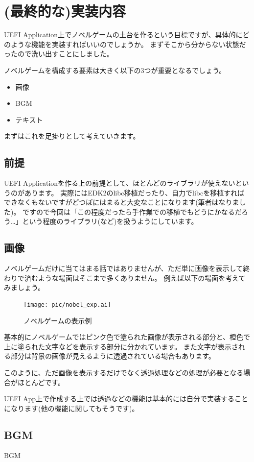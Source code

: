 \documentclass[10pt, b5paper, openany]{ltjsbook}
\begin{document}
\chapter{(最終的な)実装内容}
UEFI Application上でノベルゲームの土台を作るという目標ですが、具体的にどのような機能を実装すればいいのでしょうか。
まずそこから分からない状態だったので洗い出すことにしました。

ノベルゲームを構成する要素は大きく以下の3つが重要となるでしょう。
\begin{itemize}
    \item 画像
    \item BGM
    \item テキスト
\end{itemize}
まずはこれを足掛りとして考えていきます。

\section{前提}
UEFI Applicationを作る上の前提として、ほとんどのライブラリが使えないというのがあります。
実際にはEDK2のlibc移植だったり、自力でlibcを移植すればできなくもないですがどつぼにはまると大変なことになります(筆者はなりました)。
ですので今回は「この程度だったら手作業での移植でもどうにかなるだろう…」という程度のライブラリ(など)を扱うようにしています。

\section{画像}
ノベルゲームだけに当てはまる話ではありませんが、ただ単に画像を表示して終わりで済むような場面はそこまで多くありません。
例えば以下の場面を考えてみましょう。
\begin{figure}[H]
    \centering
    \texttt{[image: pic/nobel\_exp.ai]}
    \caption{ノベルゲームの表示例}
    \label{fig:nobel_exp}
\end{figure}
基本的にノベルゲームではピンク色で塗られた画像が表示される部分と、橙色で上に塗られた文字などを表示する部分に分かれています。
また文字が表示される部分は背景の画像が見えるように透過されている場合もあります。

このように、ただ画像を表示するだけでなく透過処理などの処理が必要となる場合がほとんどです。

UEFI App上で作成する上では透過などの機能は基本的には自分で実装することになります(他の機能に関してもそうです)。
\section{BGM}
BGM
\end{document}
